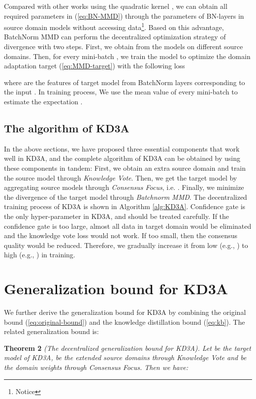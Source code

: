 \documentclass{article}
\begin{document}
Compared with other works using the quadratic kernel \cite{DBLP:conf/iccv/PengBXHSW19}, we can obtain all required parameters in (\ref{eq:BN-MMD}) through the parameters  of BN-layers in source domain models without accessing data\footnote{Notice }. Based on this advantage, BatchNorm MMD can perform the decentralized optimization strategy of divergence with two steps. First, we obtain   from the models on different source domains. Then, for every mini-batch , we train the model  to optimize the domain adaptation target (\ref{eq:MMD-target}) with the following loss

where  are the features of target model  from BatchNorm layers corresponding to the input . In training process, We use the mean value  of every mini-batch to estimate the expectation .
\subsection{The algorithm of KD3A}
In the above sections, we have proposed three essential components that work well in KD3A, and the complete algorithm of KD3A can be obtained by using these components in tandem: First, we obtain an extra source domain  and train the source model  through  \textit{Knowledge Vote}. Then, we get the target model by aggregating  source models through  \textit{Consensus Focus}, i.e. . Finally, we minimize the divergence of the target model through  \textit{Batchnorm MMD}. The decentralized training process of KD3A is shown in Algorithm \ref{alg:KD3A}. Confidence gate is the only hyper-parameter in KD3A, and should be treated carefully. If the confidence gate is too large, almost all data in target domain would be eliminated and the knowledge vote loss would not work. If too small, then the consensus quality would be reduced. Therefore, we gradually increase it from low (e.g., ) to high (e.g., ) in training. 










%
 \section{Generalization bound for KD3A}
We further derive the generalization bound for KD3A by combining the original bound (\ref{eq:original-bound}) and the knowledge distillation bound (\ref{eq:kb}). The related generalization bound is:

\textbf{Theorem 2} \textit{(The decentralized generalization bound for KD3A). Let  be the target model of KD3A,  be the extended source domains through Knowledge Vote and  be the domain weights through Consensus Focus. Then we have:}
\end{document}

